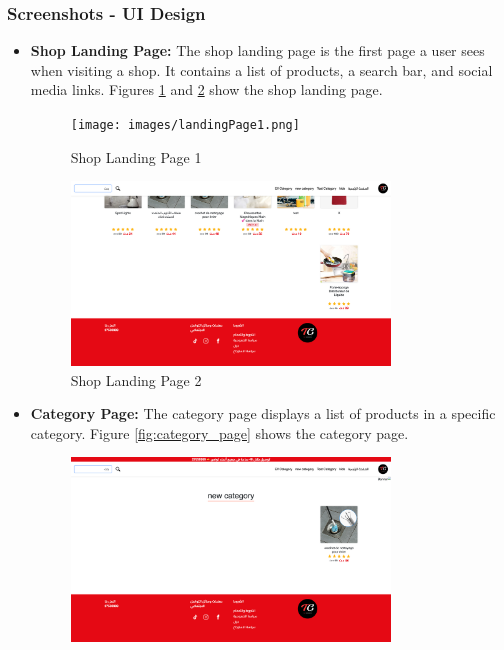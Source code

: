 \subsubsection{Screenshots - UI Design}

\begin{itemize}
    \item \textbf{Shop Landing Page:} The shop landing page is the first page a user sees when visiting a shop. It contains a list of products, a search bar, and social media links. Figures \ref{fig:shop_landing_page_one} and \ref{fig:shop_landing_page_two} show the shop landing page.
    \begin{figure}[H]
        \centering
        \texttt{[image: images/landingPage1.png]}
        \caption{Shop Landing Page 1}
        \label{fig:shop_landing_page_one}
    \end{figure}
    \begin{figure}[H]
        \centering
        \includegraphics[width=0.8\textwidth]{images/landingPage2.png}
        \caption{Shop Landing Page 2}
        \label{fig:shop_landing_page_two}
    \end{figure}
    \item \textbf{Category Page:} The category page displays a list of products in a specific category. Figure \ref{fig:category_page} shows the category page.
    \begin{figure}[H]
        \centering
        \includegraphics[width=0.8\textwidth]{images/categoryPage.png}

\end{figure}
\end{itemize}
